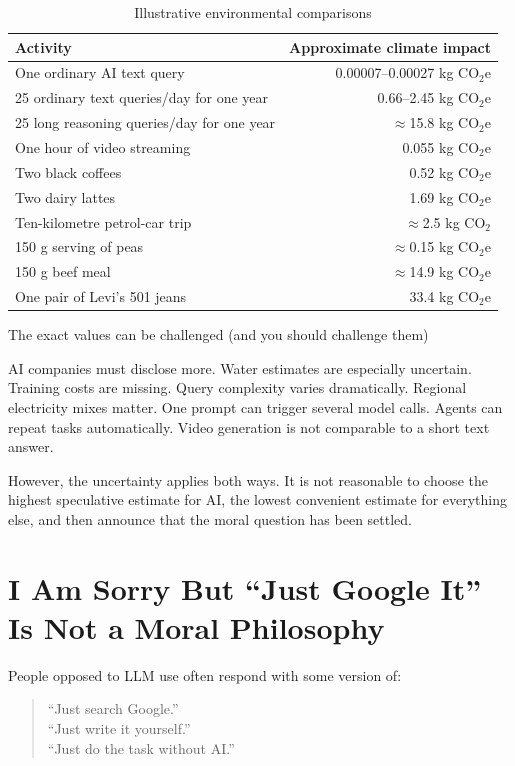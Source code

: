 \documentclass{article}
\begin{document}
\begin{table}[h]
\centering
\begin{tabular}{p{8cm}r}
\toprule
\textbf{Activity} & \textbf{Approximate climate impact} \\
\midrule
One ordinary AI text query & 0.00007--0.00027 kg CO$_2$e \\
25 ordinary text queries/day for one year & 0.66--2.45 kg CO$_2$e \\
25 long reasoning queries/day for one year & $\approx$15.8 kg CO$_2$e \\
One hour of video streaming & 0.055 kg CO$_2$e \\
Two black coffees & 0.52 kg CO$_2$e \\
Two dairy lattes & 1.69 kg CO$_2$e \\
Ten-kilometre petrol-car trip & $\approx$2.5 kg CO$_2$ \\
150 g serving of peas & $\approx$0.15 kg CO$_2$e \\
150 g beef meal & $\approx$14.9 kg CO$_2$e \\
One pair of Levi's 501 jeans & 33.4 kg CO$_2$e \\
\bottomrule
\end{tabular}
\caption{Illustrative environmental comparisons}
\end{table}

The exact values can be challenged (and you should challenge them)

AI companies must disclose more. Water estimates are especially uncertain. Training costs are missing. Query complexity varies dramatically. Regional electricity mixes matter. One prompt can trigger several model calls. Agents can repeat tasks automatically. Video generation is not comparable to a short text answer.

However, the uncertainty applies both ways. It is not reasonable to choose the highest speculative estimate for AI, the lowest convenient estimate for everything else, and then announce that the moral question has been settled.

\section*{I Am Sorry But ``Just Google It'' Is Not a Moral Philosophy}

People opposed to LLM use often respond with some version of:

\begin{quote}
``Just search Google.''\\
``Just write it yourself.''\\
``Just do the task without AI.''
\end{quote}
\end{document}
